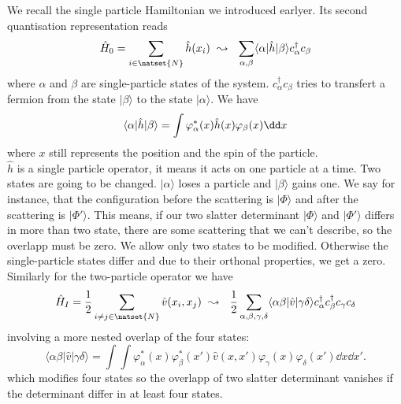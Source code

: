 \documentclass[../main.tex]{subfile}
\begin{document}
We recall the single particle Hamiltonian we introduced earlyer. Its second quantisation representation reads
\begin{equation}\label{eq:SecondQuantisationSingleParticle}
    \hat{H}_0 = \sum_{i \in \natset{N}} \hat{h}(x_i) ~ \leadsto ~~ \sum_{\alpha,\beta} \langle \alpha|\hat{h}|\beta\rangle c_{\alpha}^{\dagger}c_{\beta}
\end{equation}
where $\alpha$ and $\beta$ are single-particle states of the system. $c_{\alpha}^{\dagger}c_{\beta}$ tries to transfert a fermion
from the state $|\beta\rangle$ to the state $|\alpha\rangle$.
We have
\begin{equation}\label{eq:Translation_TwoStateOverlap}  
    \langle \alpha|\hat{h}|\beta\rangle = \int  \varphi_{\alpha}^{\ast}(x) \hat{h}(x) \varphi_{\beta}(x) \dd x\\
\end{equation}
where $x$ still represents the position and the spin of the particle.\\
$\hat{h}$ is a single particle operator, it means it acts on one particle at a time.
Two states are going to be changed. $|\alpha\rangle$ loses a particle and $|\beta\rangle$ gains one. We say for instance, that the 
configuration before the scattering is $|\Phi\rangle$ and after the scattering is $|\Phi'\rangle$. 
This means, if our two slatter determinant $|\Phi\rangle$ and $|\Phi'\rangle$ differs in more than two state, there are
some scattering that we can't describe, so the overlapp must be zero. We allow only two states to be modified. Otherwise the single-particle
states differ and due to their orthonal properties, we get a zero.\\

Similarly for the two-particle operator we have
\begin{equation}\label{eq:SecondQuantisationDoubleParticle}
    \hat{H}_I = \frac{1}{2}\sum_{i\neq j \in \natset{N}} \hat{v}(x_i, x_j) ~ \leadsto ~~ \frac{1}{2}\sum_{\alpha,\beta,\gamma,\delta} \langle \alpha\beta|\hat{v}|\gamma\delta\rangle c_{\alpha}^{\dagger}c_{\beta}^{\dagger}c_{\gamma}c_{\delta}
\end{equation}
involving a more nested overlap of the four states:
\begin{equation}\label{eq:Translation_FourStateOverlap}
    \langle\alpha\beta|\hat{v}|\gamma\delta\rangle = \int \int \varphi_{\alpha}^{\ast}(x) \varphi_{\beta}^{\ast}(x') \hat{v}(x,x') \varphi_{\gamma}(x) \varphi_{\delta}(x') \dd x \dd x'.
\end{equation}
which modifies four states so the overlapp of two slatter determinant vanishes if the determinant differ in at least four states.\\ 
\end{document}
